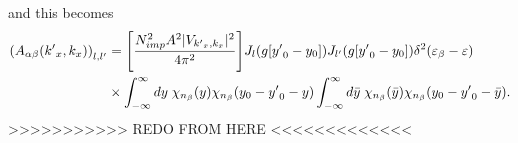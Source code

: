 and this becomes
\begin{equation} \label{4.51}
  \begin{aligned}
      \qty(A_{\alpha\beta}({k'}_x,k_x))_{l,l'} & =
      \qty[\frac { N_{imp}^2 A^2 |V_{{k'}_x,k_x}|^2}{4\pi^2}]
      J_l\qty(g[{y'}_0 - y_0]) J_{l'}\qty(g[{y'}_0 - y_0])
      \delta^2(\varepsilon_{\beta} - \varepsilon) \\
      & \times
      \int_{-\infty}^{\infty} dy \;
      {\chi}_{n_{\beta}}\qty(y)
      {\chi}_{n_{\beta}}\qty(y_0 - {y'}_0 - y)
      \int_{-\infty}^{\infty} d\bar{y} \;
      {\chi}_{n_{\beta}}\qty(\bar{y})
      {\chi}_{n_{\beta}}\qty(y_0 - {y'}_0 - \bar{y}).
  \end{aligned}
\end{equation}
>>>>>>>>>>> REDO FROM HERE <<<<<<<<<<<<<

